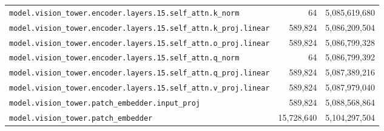 \documentclass[10pt,a4paper]{article}
\theoremstyle{definition}
\begin{document}
\begin{appendices}
\begin{longtable}{p{9.5cm}rr}
\texttt{model.\allowbreak{}vision\_tower.\allowbreak{}encoder.\allowbreak{}layers.\allowbreak{}15.\allowbreak{}self\_attn.\allowbreak{}k\_norm} & 64 & 5,085,619,680 \\
\texttt{model.\allowbreak{}vision\_tower.\allowbreak{}encoder.\allowbreak{}layers.\allowbreak{}15.\allowbreak{}self\_attn.\allowbreak{}k\_proj.\allowbreak{}linear} & 589,824 & 5,086,209,504 \\
\texttt{model.\allowbreak{}vision\_tower.\allowbreak{}encoder.\allowbreak{}layers.\allowbreak{}15.\allowbreak{}self\_attn.\allowbreak{}o\_proj.\allowbreak{}linear} & 589,824 & 5,086,799,328 \\
\texttt{model.\allowbreak{}vision\_tower.\allowbreak{}encoder.\allowbreak{}layers.\allowbreak{}15.\allowbreak{}self\_attn.\allowbreak{}q\_norm} & 64 & 5,086,799,392 \\
\texttt{model.\allowbreak{}vision\_tower.\allowbreak{}encoder.\allowbreak{}layers.\allowbreak{}15.\allowbreak{}self\_attn.\allowbreak{}q\_proj.\allowbreak{}linear} & 589,824 & 5,087,389,216 \\
\texttt{model.\allowbreak{}vision\_tower.\allowbreak{}encoder.\allowbreak{}layers.\allowbreak{}15.\allowbreak{}self\_attn.\allowbreak{}v\_proj.\allowbreak{}linear} & 589,824 & 5,087,979,040 \\
\texttt{model.\allowbreak{}vision\_tower.\allowbreak{}patch\_embedder.\allowbreak{}input\_proj} & 589,824 & 5,088,568,864 \\
\texttt{model.\allowbreak{}vision\_tower.\allowbreak{}patch\_embedder} & 15,728,640 & 5,104,297,504 \\
\end{longtable}
\end{appendices}
\end{document}
